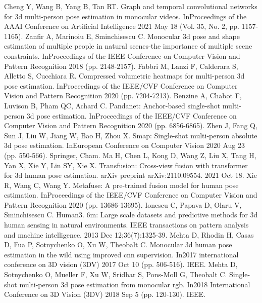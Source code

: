 \documentclass[runningheads]{llncs}
\begin{document}
\begin{thebibliography}{8}
   Cheng Y, Wang B, Yang B, Tan RT. Graph and temporal convolutional networks for 3d multi-person pose estimation in monocular videos. InProceedings of the AAAI Conference on Artificial Intelligence 2021 May 18 (Vol. 35, No. 2, pp. 1157-1165).
   Zanfir A, Marinoiu E, Sminchisescu C. Monocular 3d pose and shape estimation of multiple people in natural scenes-the importance of multiple scene constraints. InProceedings of the IEEE Conference on Computer Vision and Pattern Recognition 2018 (pp. 2148-2157).
   Fabbri M, Lanzi F, Calderara S, Alletto S, Cucchiara R. Compressed volumetric heatmaps for multi-person 3d pose estimation. InProceedings of the IEEE/CVF Conference on Computer Vision and Pattern Recognition 2020 (pp. 7204-7213).
   Benzine A, Chabot F, Luvison B, Pham QC, Achard C. Pandanet: Anchor-based single-shot multi-person 3d pose estimation. InProceedings of the IEEE/CVF Conference on Computer Vision and Pattern Recognition 2020 (pp. 6856-6865).
   Zhen J, Fang Q, Sun J, Liu W, Jiang W, Bao H, Zhou X. Smap: Single-shot multi-person absolute 3d pose estimation. InEuropean Conference on Computer Vision 2020 Aug 23 (pp. 550-566). Springer, Cham.
   Ma H, Chen L, Kong D, Wang Z, Liu X, Tang H, Yan X, Xie Y, Lin SY, Xie X. Transfusion: Cross-view fusion with transformer for 3d human pose estimation. arXiv preprint arXiv:2110.09554. 2021 Oct 18.
   Xie R, Wang C, Wang Y. Metafuse: A pre-trained fusion model for human pose estimation. InProceedings of the IEEE/CVF Conference on Computer Vision and Pattern Recognition 2020 (pp. 13686-13695).
   Ionescu C, Papava D, Olaru V, Sminchisescu C. Human3. 6m: Large scale datasets and predictive methods for 3d human sensing in natural environments. IEEE transactions on pattern analysis and machine intelligence. 2013 Dec 12;36(7):1325-39.
   Mehta D, Rhodin H, Casas D, Fua P, Sotnychenko O, Xu W, Theobalt C. Monocular 3d human pose estimation in the wild using improved cnn supervision. In2017 international conference on 3D vision (3DV) 2017 Oct 10 (pp. 506-516). IEEE.
   Mehta D, Sotnychenko O, Mueller F, Xu W, Sridhar S, Pons-Moll G, Theobalt C. Single-shot multi-person 3d pose estimation from monocular rgb. In2018 International Conference on 3D Vision (3DV) 2018 Sep 5 (pp. 120-130). IEEE.
\end{thebibliography}
\end{document}
